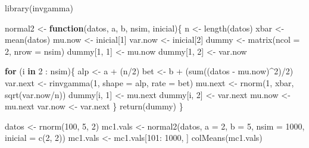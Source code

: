 \documentclass[
  10pt,
  spanish,
]{book}
\newenvironment{Shaded}{\begin{snugshade}}{\end{snugshade}}
\newcommand{\AttributeTok}[1]{\textcolor[rgb]{0.77,0.63,0.00}{#1}}
\newcommand{\ControlFlowTok}[1]{\textcolor[rgb]{0.13,0.29,0.53}{\textbf{#1}}}
\newcommand{\DecValTok}[1]{\textcolor[rgb]{0.00,0.00,0.81}{#1}}
\newcommand{\FunctionTok}[1]{\textcolor[rgb]{0.00,0.00,0.00}{#1}}
\newcommand{\NormalTok}[1]{#1}
\newcommand{\OtherTok}[1]{\textcolor[rgb]{0.56,0.35,0.01}{#1}}
\newcommand{\SpecialCharTok}[1]{\textcolor[rgb]{0.00,0.00,0.00}{#1}}
\theoremstyle{definition}
\theoremstyle{definition}
\theoremstyle{definition}
\theoremstyle{definition}
\theoremstyle{remark}
\begin{document}
\begin{Shaded}
\begin{Highlighting}[]
\FunctionTok{library}\NormalTok{(invgamma)}

\NormalTok{normal2 }\OtherTok{\textless{}{-}} \ControlFlowTok{function}\NormalTok{(datos, a, b, nsim, inicial)\{}
\NormalTok{  n }\OtherTok{\textless{}{-}} \FunctionTok{length}\NormalTok{(datos)}
\NormalTok{  xbar }\OtherTok{\textless{}{-}} \FunctionTok{mean}\NormalTok{(datos)}
\NormalTok{  mu.now }\OtherTok{\textless{}{-}}\NormalTok{ inicial[}\DecValTok{1}\NormalTok{]}
\NormalTok{  var.now }\OtherTok{\textless{}{-}}\NormalTok{ inicial[}\DecValTok{2}\NormalTok{]}
\NormalTok{  dummy }\OtherTok{\textless{}{-}} \FunctionTok{matrix}\NormalTok{(}\AttributeTok{ncol =} \DecValTok{2}\NormalTok{, }\AttributeTok{nrow =}\NormalTok{ nsim)}
\NormalTok{  dummy[}\DecValTok{1}\NormalTok{, }\DecValTok{1}\NormalTok{] }\OtherTok{\textless{}{-}}\NormalTok{ mu.now}
\NormalTok{  dummy[}\DecValTok{1}\NormalTok{, }\DecValTok{2}\NormalTok{] }\OtherTok{\textless{}{-}}\NormalTok{ var.now}
  
  \ControlFlowTok{for}\NormalTok{ (i }\ControlFlowTok{in} \DecValTok{2} \SpecialCharTok{:}\NormalTok{ nsim)\{}
\NormalTok{    alp }\OtherTok{\textless{}{-}}\NormalTok{ a }\SpecialCharTok{+}\NormalTok{ (n}\SpecialCharTok{/}\DecValTok{2}\NormalTok{)}
\NormalTok{    bet }\OtherTok{\textless{}{-}}\NormalTok{ b }\SpecialCharTok{+}\NormalTok{ (}\FunctionTok{sum}\NormalTok{((datos }\SpecialCharTok{{-}}\NormalTok{ mu.now)}\SpecialCharTok{\^{}}\DecValTok{2}\NormalTok{)}\SpecialCharTok{/}\DecValTok{2}\NormalTok{)}
\NormalTok{    var.next }\OtherTok{\textless{}{-}} \FunctionTok{rinvgamma}\NormalTok{(}\DecValTok{1}\NormalTok{, }\AttributeTok{shape =}\NormalTok{ alp, }\AttributeTok{rate =}\NormalTok{ bet)}
\NormalTok{    mu.next }\OtherTok{\textless{}{-}} \FunctionTok{rnorm}\NormalTok{(}\DecValTok{1}\NormalTok{, xbar, }\FunctionTok{sqrt}\NormalTok{(var.now}\SpecialCharTok{/}\NormalTok{n))}
\NormalTok{    dummy[i, }\DecValTok{1}\NormalTok{] }\OtherTok{\textless{}{-}}\NormalTok{ mu.next}
\NormalTok{    dummy[i, }\DecValTok{2}\NormalTok{] }\OtherTok{\textless{}{-}}\NormalTok{ var.next}
\NormalTok{    mu.now }\OtherTok{\textless{}{-}}\NormalTok{ mu.next}
\NormalTok{    var.now }\OtherTok{\textless{}{-}}\NormalTok{ var.next}
\NormalTok{  \}}
  \FunctionTok{return}\NormalTok{(dummy)}
\NormalTok{\}}

\NormalTok{datos }\OtherTok{\textless{}{-}} \FunctionTok{rnorm}\NormalTok{(}\DecValTok{100}\NormalTok{, }\DecValTok{5}\NormalTok{, }\DecValTok{2}\NormalTok{)}
\NormalTok{mc1.vals }\OtherTok{\textless{}{-}} \FunctionTok{normal2}\NormalTok{(datos, }\AttributeTok{a =} \DecValTok{2}\NormalTok{, }\AttributeTok{b =} \DecValTok{5}\NormalTok{, }
                    \AttributeTok{nsim =} \DecValTok{1000}\NormalTok{, }\AttributeTok{inicial =} \FunctionTok{c}\NormalTok{(}\DecValTok{2}\NormalTok{, }\DecValTok{2}\NormalTok{))}
\NormalTok{mc1.vals }\OtherTok{\textless{}{-}}\NormalTok{ mc1.vals[}\DecValTok{101}\SpecialCharTok{:} \DecValTok{1000}\NormalTok{, ]}
\FunctionTok{colMeans}\NormalTok{(mc1.vals)}
\end{Highlighting}
\end{Shaded}
\end{document}
